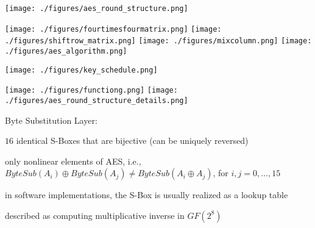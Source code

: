 \documentclass[landscape, a4paper]{article}
\begin{document}
\begin{minipage}[t]{0.2\linewidth}
\begin{betterlist}
\begin{betterlist}
		\end{betterlist}
		\begin{minipage}[b]{0.64\linewidth}
			\texttt{[image: ./figures/aes\_round\_structure.png]}
		\end{minipage}
		\begin{minipage}[b]{0.34\linewidth}
			\texttt{[image: ./figures/fourtimesfourmatrix.png]}
			\texttt{[image: ./figures/shiftrow\_matrix.png]}
			\texttt{[image: ./figures/mixcolumn.png]}
			\texttt{[image: ./figures/aes\_algorithm.png]}
		\end{minipage}
		\begin{minipage}[b]{0.49\linewidth}
			\texttt{[image: ./figures/key\_schedule.png]}
		\end{minipage}
		\begin{minipage}[b]{0.49\linewidth}
			\texttt{[image: ./figures/functiong.png]}
			\texttt{[image: ./figures/aes\_round\_structure\_details.png]}
		\end{minipage}
		\begin{betterlist}
			\item \alert{Byte Substitution Layer:}
			\begin{betterlist}
				\item $16$ \alert{identical} S-Boxes that are \alert{bijective} (can be \alert{uniquely reversed})
				\item only \alert{nonlinear} elements of AES, i.e., $ByteSub(A_i) \oplus ByteSub(A_j) \ne ByteSub(A_i \oplus A_j)$, for $i, j = 0,\ldots,15$
				\item in software implementations, the S-Box is usually realized as a lookup table
				\item described as computing \alert{multiplicative inverse} in $GF(2^8)$


\end{betterlist}
\end{betterlist}
\end{betterlist}
\end{minipage}
\end{document}
